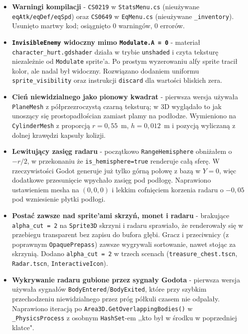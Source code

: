 \begin{itemize}
    \item \textbf{Warningi kompilacji} - \texttt{CS0219} w \texttt{StatsMenu.cs} (nieużywane \texttt{eqAtk/eqDef/eqSpd}) oraz \texttt{CS0649} w \texttt{EqMenu.cs} (nieużywane \texttt{\_inventory}). Usunięto martwy kod; osiągnięto 0 warningów, 0 errorów.
    \item \textbf{\texttt{InvisibleEnemy} widoczny mimo \texttt{Modulate.A = 0}} - materiał \texttt{character\_\allowbreak hurt.\allowbreak gdshader} działa w trybie \texttt{unshaded} i czyta teksturę niezależnie od \texttt{Modulate} sprite'a. Po prostym wyzerowaniu alfy sprite tracił kolor, ale nadal był widoczny. Rozwiązano dodaniem uniformu \texttt{sprite\_\allowbreak visibility} oraz instrukcji \texttt{discard} dla wartości bliskich zera.
    \item \textbf{Cień niewidzialnego jako pionowy kwadrat} - pierwsza wersja używała \texttt{PlaneMesh} z półprzezroczystą czarną teksturą; w 3D wyglądało to jak unoszący się prostopadłościan zamiast plamy na podłodze. Wymieniono na \texttt{CylinderMesh} z proporcją $r = 0{,}55$~m, $h = 0{,}012$~m i pozycją wyliczaną z dolnej krawędzi kapsuły kolizji.
    \item \textbf{Lewitujący zasięg radaru} - początkowo \texttt{RangeHemisphere} obniżałem o $-r/2$, w przekonaniu że \texttt{is\_hemisphere=true} renderuje całą sferę. W rzeczywistości Godot generuje już tylko górną połowę z bazą w $Y = 0$, więc dodatkowe przesunięcie wpychało zasięg pod podłogę. Naprawiono ustawieniem mesha na $(0,0,0)$ i lekkim cofnięciem korzenia radaru o $-0{,}05$ pod wzniesienie płytki podłogi.
    \item \textbf{Postać zawsze nad sprite'ami skrzyń, monet i radaru} - brakujące \texttt{alpha\_cut = 2} na \texttt{Sprite3D} skrzyni i radaru sprawiało, że renderowały się w przebiegu transparent bez zapisu do bufora głębi. Gracz i przeciwnicy (z poprawnym \texttt{OpaquePrepass}) zawsze wygrywali sortowanie, nawet stojąc za skrzynią. Dodano \texttt{alpha\_cut = 2} w trzech scenach (\texttt{treasure\_chest.tscn}, \texttt{Radar.tscn}, \texttt{InteractiveIcon}).
    \item \textbf{Wykrywanie radaru gubione przez sygnały Godota} - pierwsza wersja używała sygnałów \texttt{BodyEntered}/\texttt{BodyExited}, które przy szybkim przechodzeniu niewidzialnego przez próg półkuli czasem nie odpalały. Naprawiono iteracją po \texttt{Area3D.\allowbreak Get\allowbreak Overlapping\allowbreak Bodies()} w \texttt{\_PhysicsProcess} z osobnym \texttt{HashSet}-em ,,kto był w środku w poprzedniej klatce".

\end{itemize}
